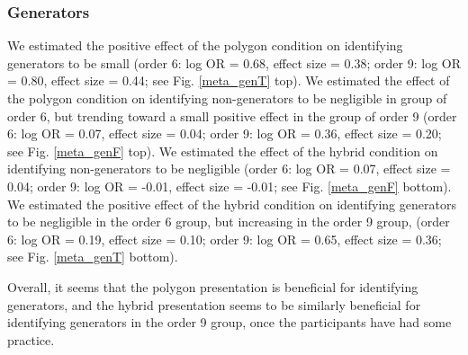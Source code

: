 \documentclass[man,mask,10pt]{apa6}
\begin{document}
\subsubsection{Generators} We estimated the positive effect of the polygon condition on identifying generators to be small (order 6: log OR = 0.68, effect size = 0.38; order 9: log OR = 0.80, effect size = 0.44; see Fig. \ref{meta_genT} top). We estimated the effect of the polygon condition on identifying non-generators to be negligible in group of order 6, but trending toward a small positive effect in the group of order 9 (order 6: log OR = 0.07, effect size = 0.04; order 9: log OR = 0.36, effect size = 0.20; see Fig. \ref{meta_genF} top). We estimated the effect of the hybrid condition on identifying non-generators to be negligible (order 6: log OR = 0.07, effect size = 0.04; order 9: log OR = -0.01, effect size = -0.01; see Fig. \ref{meta_genF} bottom). We estimated the positive effect of the hybrid condition on identifying generators to be negligible in the order 6 group, but increasing in the order 9 group, (order 6: log OR = 0.19, effect size = 0.10; order 9: log OR = 0.65, effect size = 0.36; see Fig. \ref{meta_genT} bottom). \par
Overall, it seems that the polygon presentation is beneficial for identifying generators, and the hybrid presentation seems to be similarly beneficial for identifying generators in the order 9 group, once the participants have had some practice. 
\end{document}
